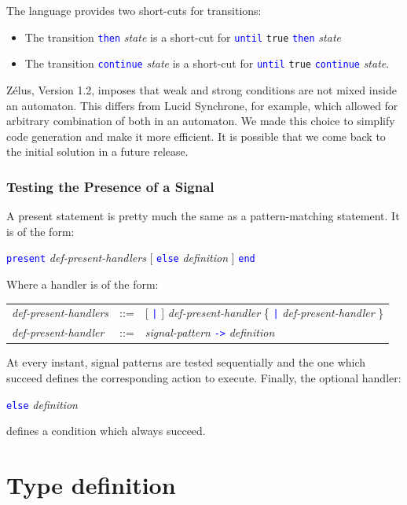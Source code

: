 \documentclass[11pt,titlepage,twoside]{report}
\newcommand{\zelus}{{\sf Z\'elus}}
\newcommand{\lucy}{{\sf Lucid Synchrone}}
\newcommand{\Then}{\mbox{{\tt then}}}
\newcommand{\Until}{\mbox{\tt until}}
\newcommand{\Continue}{\mbox{\tt continue}}
\newcommand{\term}[1]{\textcolor{Blue}{\tt #1}}
\newcommand{\nterm}[1]{\textcolor{BrickRed}{\it #1}}
\newcommand{\term}[1]{{\tt #1}}
\newcommand{\nterm}[1]{{\em #1}}
\begin{document}
The language provides two short-cuts for transitions:

\begin{itemize}
\item
  The transition \term{\Then} \nterm{state} is a short-cut for
  \term{\Until} {\tt true}
  \term{\Then} \nterm{state}
\item
  The transition \term{\Continue} \nterm{state} is a short-cut
  for \term{\Until} {\tt true} \term{\Continue} \nterm{state}.
\end{itemize}

\zelus, Version 1.2, imposes that weak and strong conditions are not mixed inside
an automaton. This differs from \lucy, for example, which allowed for arbitrary
combination of both in an automaton. We made this choice to simplify code
generation and make it more efficient. It is possible that we come back to
the initial solution in a future release.

\subsubsection{Testing the Presence of a Signal}

A present statement is pretty much the same as a pattern-matching
statement. It is of the form: 
\begin{center}
  \term{present} \nterm{def-present-handlers} [ \term{else} \nterm{definition} ]
  \term{end}
\end{center}
Where a handler is of the form:
\begin{center}
\begin{tabular}{lcl}
\nterm{def-present-handlers}
   & ::=        & [ \term{|} ] \nterm{def-present-handler}
                  \{ \term{|} \nterm{def-present-handler} \} 
\\
\nterm{def-present-handler}
   & ::=        & \nterm{signal-pattern} \term{->} \nterm{definition}
\end{tabular}
\end{center}
At every instant, signal patterns are tested sequentially and the one which succeed
defines the corresponding action to execute. Finally, the optional handler:
\begin{center} 
  \term{else} \nterm{definition}
\end{center}
defines a condition which always succeed.

\section{Type definition\label{langtypedefs}} %
\end{document}
